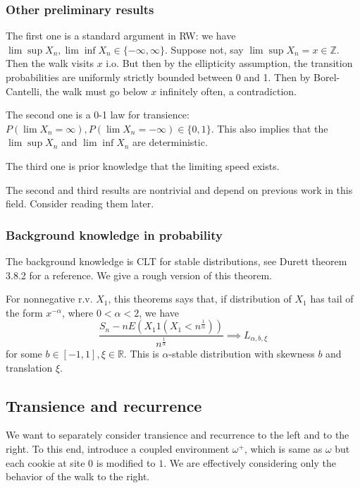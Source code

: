 \subsubsection{Other preliminary results}

The first one is a standard argument in RW: we have $\lim\sup  X_n, \lim\inf X_n \in \{- \infty , \infty \} $. Suppose not, say $\lim \sup  X_n = x \in \mathbb{Z}$. Then the walk visits $x$ i.o. But then by the ellipticity assumption, the transition probabilities are uniformly strictly bounded between 0 and 1. Then by Borel-Cantelli, the walk must go below $x$ infinitely often, a contradiction.

The second one is a 0-1 law for transience: $P(\lim X_n = \infty ), P(\lim X_n = - \infty ) \in \{0, 1\} $. This also implies that the $\lim \sup  X_n$ and $\lim \inf  X_n$ are deterministic.

The third one is prior knowledge that the limiting speed exists. 

The second and third results are nontrivial and depend on previous work in this field. Consider reading them later.


\subsubsection{Background knowledge in probability}

The background knowledge is CLT for stable distributions, see Durett theorem 3.8.2 for a reference. 
We give a rough version of this theorem.

For nonnegative r.v. $X_1$, this theorems says that, if distribution of $X_1$ has tail of the form $x^{- \alpha} $, where $0 < \alpha < 2$, we have 
\[
	\frac{S_n - n E(X_1 1(X_1 < n^{\frac{1}{\alpha}})) }{n^{\frac{1}{\alpha}}} \implies L_{\alpha, b, \xi}
\] 
for some $b \in [-1, 1], \xi \in \mathbb{R}$. This is $\alpha$-stable distribution with skewness $b$ and translation $\xi$.

\subsection{Transience and recurrence}

We want to separately consider transience and recurrence to the left and to the right. To this end, introduce a coupled environment $\omega^+$, which is same as $\omega$ but each cookie at site $0$ is modified to $1$. We are effectively considering only the behavior of the walk to the right.


